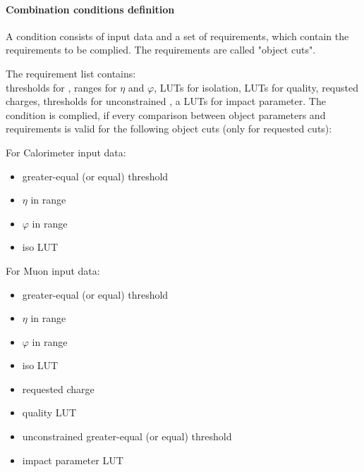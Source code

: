 \paragraph{Combination conditions definition}
\label{sec:gtl:comb_cond_def}

A condition consists of input data and a set of requirements, which contain the requirements to be complied. The requirements are called "object cuts".

The requirement list contains:\\
thresholds for \pt, ranges for $\eta$ and $\varphi$, LUTs for isolation, LUTs for quality, requsted charges, thresholds for unconstrained \pt, a LUTs for impact parameter.
The condition is complied, if every comparison between object parameters and requirements is valid for the following object cuts (only for requested cuts):

For Calorimeter input data:
\begin{itemize}
\item \pt greater-equal (or equal) threshold
\item $\eta$ in range
\item $\varphi$ in range
\item iso LUT
\end{itemize}

For Muon input data:
\begin{itemize}
\item \pt greater-equal (or equal) threshold
\item $\eta$ in range
\item $\varphi$ in range
\item iso LUT
\item requested charge
\item quality LUT
\item unconstrained \pt greater-equal (or equal) threshold
\item impact parameter LUT
\end{itemize}

